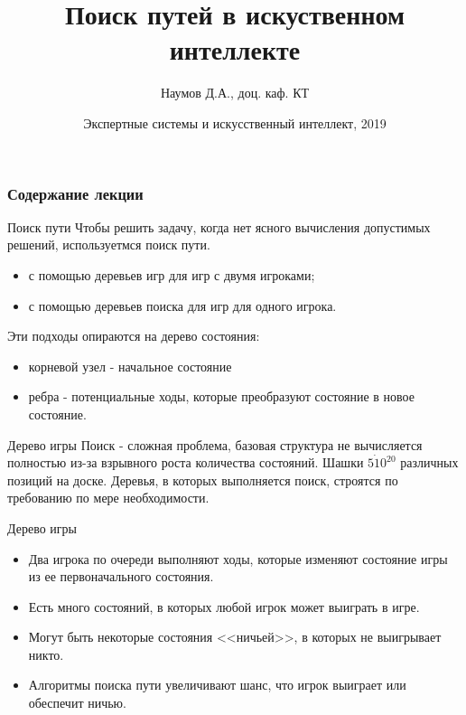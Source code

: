 \documentclass{beamer}
\title[Artifical Intelligence]{Поиск путей в искуственном интеллекте}
\author{Наумов Д.А., доц. каф. КТ}
\date[08.10.2019] {Экспертные системы и искусственный интеллект, 2019}
\begin{document}
\begin{frame}
  \titlepage
\end{frame}
  
\begin{frame}
  \frametitle{Содержание лекции}
  \tableofcontents  
\end{frame}

\begin{frame}{Поиск пути}
Чтобы решить задачу, когда нет ясного вычисления допустимых решений, используетмся поиск пути.
\begin{itemize}
\item с помощью деревьев игр для игр с двумя игроками;
\item с помощью деревьев поиска для игр для одного игрока.
\end{itemize}
Эти подходы опираются на дерево состояния:
\begin{itemize}
\item корневой узел - начальное состояние
\item ребра - потенциальные ходы, которые преобразуют состояние в новое состояние. 
\end{itemize}
\end{frame}

\begin{frame}{Дерево игры}
Поиск  - сложная проблема, базовая структура не вычисляется полностью из-за взрывного роста количества состояний. Шашки $5\dot10^20$ различных позиций на доске. Деревья, в которых выполняется поиск, строятся по требованию по мере необходимости.
\begin{block}{Дерево игры}
\begin{itemize}
\item Два игрока по очереди выполняют ходы, которые изменяют состояние игры из ее первоначального состояния. 
\item Есть много состояний, в которых любой игрок может выиграть в игре. 
\item Могут быть некоторые состояния <<ничьей>>, в которых не выигрывает никто. 
\item Алгоритмы поиска пути увеличивают шанс, что игрок выиграет или обеспечит ничью.
\end{itemize}
\end{block}
\end{frame}
\end{document}
